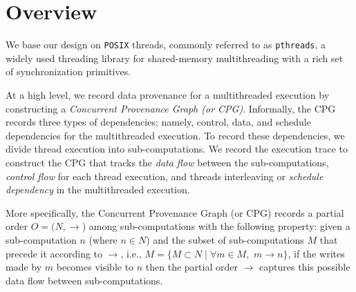 \section{Overview}
\label{sec:overview}
%


We base our design on {\tt POSIX} threads, commonly referred to as
{\tt pthreads}, a widely used threading library for shared-memory
multithreading with a rich set of synchronization primitives.  


 At a high level, we record data provenance for a multithreaded execution by constructing a {\em Concurrent Provenance Graph (or CPG)}. Informally,  the CPG records three types of dependencies; namely, control, data, and schedule dependencies for the multithreaded execution. To record these dependencies, we divide thread execution into sub-computations. We record the execution trace to construct the CPG that tracks the {\em data flow} between the sub-computations, {\em control flow} for each thread execution, and threads interleaving or {\em schedule dependency}  in the multithreaded execution.

More specifically, the Concurrent Provenance Graph (or CPG) records a partial order $O = (N, \rightarrow$) among sub-computations with the following property: given a sub-computation $n$ (where $n \in N $)  and the subset of sub-computations $M$ that precede it according to $\rightarrow$, i.e., $M = \{M \subset N \mid \forall m \in M,$ $m \rightarrow n\}$, if the writes made by $m$ becomes visible to $n$ then the partial order $\rightarrow$ captures this possible data flow between sub-computations.

